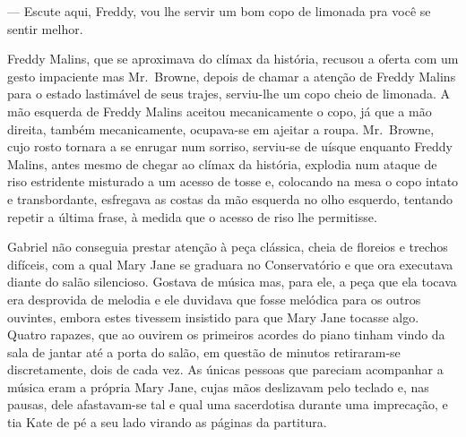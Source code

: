 --- Escute aqui, Freddy, vou lhe servir um bom copo de limonada pra você se
sentir melhor.

Freddy Malins, que se aproximava do clímax da história, recusou a oferta com um
gesto impaciente mas Mr.~Browne, depois de chamar a atenção de Freddy Malins
para o estado lastimável de seus trajes, serviu-lhe um copo cheio de limonada.
A mão esquerda de Freddy Malins aceitou mecanicamente o copo, já que a mão
direita, também mecanicamente, ocupava-se em ajeitar a roupa.  Mr.~Browne, cujo
rosto tornara a se enrugar num sorriso, serviu-se de uísque enquanto Freddy
Malins, antes mesmo de chegar ao clímax da história, explodia num ataque de
riso estridente misturado a um acesso de tosse e, colocando na mesa o copo
intato e transbordante, esfregava as costas da mão esquerda no olho esquerdo,
tentando repetir a última frase, à medida que o acesso de riso lhe permitisse.

\smallskip

\noindent\dotfill

\smallskip

Gabriel não conseguia prestar atenção à peça clássica, cheia de floreios e
trechos difíceis, com a qual Mary Jane se graduara no Conservatório e que ora
executava diante do salão silencioso.  Gostava de música mas, para ele, a peça
que ela tocava era desprovida de melodia e ele duvidava que fosse melódica para
os outros ouvintes, embora estes tivessem insistido para que Mary Jane tocasse
algo.  Quatro rapazes, que ao ouvirem os primeiros acordes do piano tinham
vindo da sala de jantar até a porta do salão, em questão de minutos
retiraram-se discretamente, dois de cada vez.  As únicas pessoas que pareciam
acompanhar a música eram a própria Mary Jane, cujas mãos deslizavam pelo
teclado e, nas pausas, dele afastavam-se tal e qual uma sacerdotisa durante uma
imprecação, e tia Kate de pé a seu lado virando as páginas da partitura.

